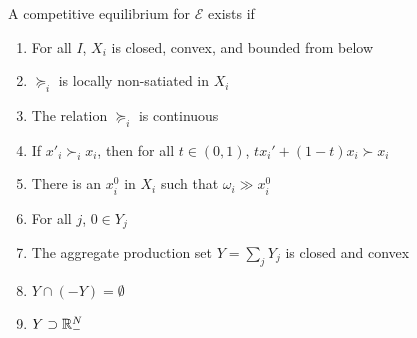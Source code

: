 \documentclass[10pt]{article}
\begin{document}
\begin{model}
	\begin{theorem}
		 A competitive equilibrium for $\mathcal{E}$ exists if
		\begin{enumerate}
			\item For all $I$, $X_i$ is closed, convex, and bounded from below
			\item $\succeq_i$ is locally non-satiated in $X_i$
			\item The relation $\succeq_i$ is continuous
			\item If $x'_i \succ_i x_i$, then for all $t\in (0,1)$, $tx_i' + (1-t)x_i \succ x_i$
			\item There is an $x^0_i$ in $X_i$ such that $\omega_i \gg x^0_i$
			\item For all $j$, $0 \in Y_j$
			\item The aggregate production set $Y = \sum_j Y_j$ is closed and convex
			\item $Y \cap (-Y) = \emptyset$
			\item $Y \supset \mathbb{R}^N_-$
		\end{enumerate}
	\end{theorem}
\end{model}
\end{document}
